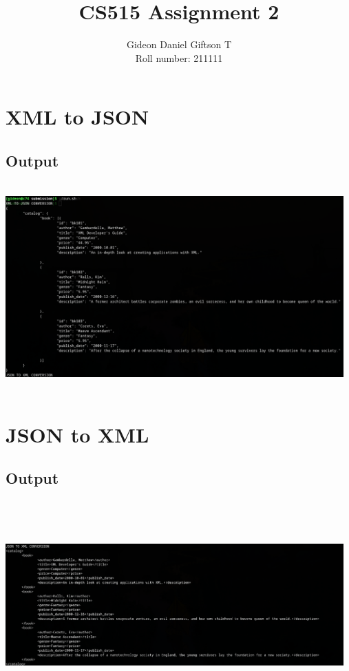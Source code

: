 \documentclass{article}
\title{CS515 Assignment 2}
\author{Gideon Daniel Giftson T\\Roll number: 211111}
\begin{document}
\maketitle
\section{XML to JSON}
\subsection{Output}
\includegraphics[width=13cm,height=8cm,keepaspectratio]{out1.png}
\section{JSON to XML}
\subsection{Output}
\includegraphics[width=13cm,height=8cm,keepaspectratio]{out2.png}
\end{document}
